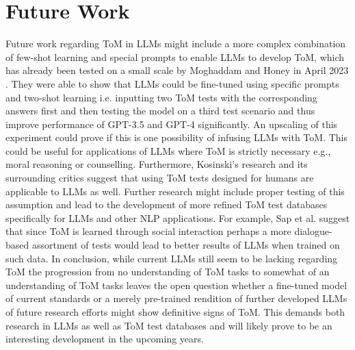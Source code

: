 \section{Future Work}
Future work regarding ToM in LLMs might include a more complex combination of few-shot learning and special prompts to enable LLMs to develop ToM, which has already been tested on a small scale by Moghaddam and Honey in April 2023 \cite{future}. They were able to show that LLMs could be fine-tuned using specific prompts and two-shot learning i.e. inputting two ToM tests with the corresponding answers first and then testing the model on a third test scenario and thus improve performance of GPT-3.5 and GPT-4 significantly. An upscaling of this experiment could prove if this is one possibility of infusing LLMs with ToM. This could be useful for applications of LLMs where ToM is strictly necessary e.g., moral reasoning or counselling. Furthermore, Kosinski's research and its surrounding critics suggest that using ToM tests designed for humans are applicable to LLMs as well. Further research might include proper testing of this assumption and lead to the development of more refined ToM test databases specifically for LLMs and other NLP applications. For example, Sap et al. \cite{related} suggest that since ToM is learned through social interaction perhaps a more dialogue-based assortment of tests would lead to better results of LLMs when trained on such data. In conclusion, while current LLMs still seem to be lacking regarding ToM the progression from no understanding of ToM tasks to somewhat of an understanding of ToM tasks leaves the open question whether a fine-tuned model of current standards or a merely pre-trained rendition of further developed LLMs of future research efforts might show definitive signs of ToM. This demands both research in LLMs as well as ToM test databases and will likely prove to be an interesting development in the upcoming years.